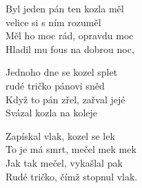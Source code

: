 \ve{} 
Byl jeden pán ten kozla měl\\
velice si s ním rozuměl\\
Měl ho moc rád, opravdu moc\\
Hladil mu fous na dobrou noc,

\ve{}
Jednoho dne se kozel splet\\
rudé tričko pánovi sněd\\
Když to pán zřel, zařval jejé\\
Svázal kozla na koleje

\ve{}
Zapískal vlak, kozel se lek\\
To je má smrt, mečel mek mek\\
Jak tak mečel, vykašlal pak\\
Rudé tričko, čímž stopnul vlak.
\esong{}
